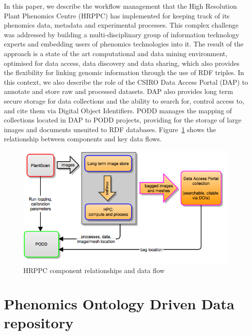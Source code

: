 \documentclass{llncs}
\begin{document}
In this paper, we describe the workflow management that the High Resolution
Plant Phenomics Centre (HRPPC) has implemented for keeping track of its
phenomics data, metadata and experimental processes. This complex challenge was
addressed by building a multi-disciplinary group of information technology
experts and embedding users of phenomics technologies into it. The result of the
approach is a state of the art computational and data mining environment,
optimised for data access, data discovery and data sharing, which also provides
the flexibility for linking genomic information through the use of RDF triples.
In this context, we also describe the role of the CSIRO Data Access Portal (DAP) \cite{DAP}
to annotate and store raw and processed datasets. DAP also
provides long term secure storage for data collections and the ability to search
for, control access to, and cite them via Digital Object Identifiers. PODD
manages the mapping of collections located in DAP to PODD projects, providing
for the storage of large images and documents unsuited to RDF databases. Figure~\ref{hrppccomponents}
 shows the relationship between components and key data flows.


\begin{figure}
\begin{center}
 \includegraphics[width=12cm,keepaspectratio=true]{plantscan-workflow-figure1.png}

\caption{HRPPC component relationships and data flow}
\label{hrppccomponents}
\end{center}
\end{figure}


\section{Phenomics Ontology Driven Data repository}
\end{document}
